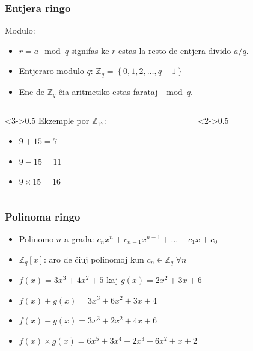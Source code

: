 \documentclass[utf8, aspectratio=169]{beamer}
\begin{document}
\begin{frame}
  \frametitle{Entjera ringo}

  Modulo:
  \begin{itemize}
  \item $r = a \mod q$ signifas ke $r$ estas la resto de entjera divido $a/q$.
  \item Entjeraro modulo $q$: $\mathbb{Z}_q = \left\{0, 1, 2, \ldots, q-1\right\}$
  \item Ene de $\mathbb{Z}_q$ ĉia aritmetiko estas farataj $\mod q$.
  \end{itemize}
  \begin{columns}
    \begin{column}<3->{0.5\textwidth}
      Ekzemple por $\mathbb{Z}_{17}$:
      \begin{itemize}
      \item $9 + 15 = 7$
      \item $9 - 15 = 11$
      \item $9 \times 15 = 16$
      \end{itemize}
    \end{column}
    \begin{column}<2->{0.5\textwidth}
    \end{column}
  \end{columns}
\end{frame}

\begin{frame}
  \frametitle{Polinoma ringo}
  \begin{itemize}
  \item Polinomo $n$-a grada: $c_nx^n + c_{n-1}x^{n-1} + \ldots + c_1 x + c_0$
  \item $\mathbb{Z}_q[x]$: aro de ĉiuj polinomoj kun $c_n \in \mathbb{Z}_q
    \;\forall n$

  \end{itemize}

  \vspace{2em}
  \begin{itemize}
  \item<3-> $f(x) = 3x^3 + 4x^2 + 5$ kaj $g(x) = 2x^2 + 3x + 6$
  \item<4-> $f(x) + g(x) = 3x^3 + 6x^2 + 3x + 4$
  \item<5-> $f(x) - g(x) = 3x^3 + 2x^2 + 4x + 6$
  \item<6-> $f(x) \times g(x) = 6x^5 + 3x^4 + 2x^3 + 6x^2 + x + 2$
  \end{itemize}

\end{frame}
\end{document}
